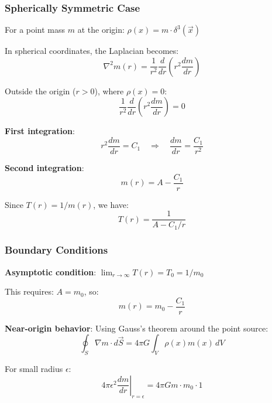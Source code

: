 \documentclass[12pt,a4paper]{article}
\begin{document}
	\subsubsection{Spherically Symmetric Case}
	\label{subsubsec:spherical_case}
	
	For a point mass $m$ at the origin: $\rho(x) = m \cdot \delta^3(\vec{x})$
	
	In spherical coordinates, the Laplacian becomes:
	\begin{equation}
		\nabla^2 m(r) = \frac{1}{r^2}\frac{d}{dr}\left(r^2 \frac{dm}{dr}\right)
	\end{equation}
	
	Outside the origin ($r > 0$), where $\rho(x) = 0$:
	\begin{equation}
		\frac{1}{r^2}\frac{d}{dr}\left(r^2 \frac{dm}{dr}\right) = 0
	\end{equation}
	
	\textbf{First integration}:
	\begin{equation}
		r^2 \frac{dm}{dr} = C_1 \quad \Rightarrow \quad \frac{dm}{dr} = \frac{C_1}{r^2}
	\end{equation}
	
	\textbf{Second integration}:
	\begin{equation}
		m(r) = A - \frac{C_1}{r}
	\end{equation}
	
	Since $T(r) = 1/m(r)$, we have:
	\begin{equation}
		T(r) = \frac{1}{A - C_1/r}
	\end{equation}
	
	\subsubsection{Boundary Conditions}
	\label{subsubsec:boundary_conditions}
	
	\textbf{Asymptotic condition}: $\lim_{r \to \infty} T(r) = T_0 = 1/m_0$
	
	This requires: $A = m_0$, so:
	\begin{equation}
		m(r) = m_0 - \frac{C_1}{r}
	\end{equation}
	
	\textbf{Near-origin behavior}: Using Gauss's theorem around the point source:
	\begin{equation}
		\oint_S \nabla m \cdot d\vec{S} = 4\pi G \int_V \rho(x) m(x) \, dV
	\end{equation}
	
	For small radius $\epsilon$:
	\begin{equation}
		4\pi \epsilon^2 \left.\frac{dm}{dr}\right|_{r=\epsilon} = 4\pi G m \cdot m_0 \cdot 1
	\end{equation}
	
\end{document}
